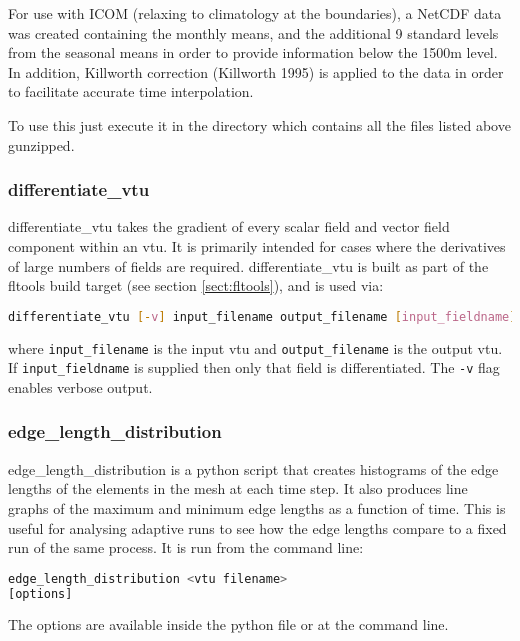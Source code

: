 For use with ICOM (relaxing to climatology at the boundaries), a NetCDF data was created containing the monthly means, and the additional 9 standard levels from the seasonal means in order to provide information below the 1500m level. In addition, Killworth correction (Killworth 1995) is applied to the data in order to facilitate accurate time interpolation.

To use this just execute it in the directory which contains all the files listed above gunzipped.


\subsubsection{differentiate\_vtu}
\label{sect:differentiate_vtu}

differentiate\_vtu takes the gradient of every scalar field and vector field
component within an vtu. It is primarily intended for cases where the derivatives
of large numbers of fields are required. differentiate\_vtu is built as part of the fltools
build target (see section \ref{sect:fltools}), and is used via:

\begin{lstlisting}[language = Bash]
differentiate_vtu [-v] input_filename output_filename [input_fieldname]
\end{lstlisting}

where \lstinline[language = Bash]+input_filename+ is the input vtu and
\lstinline[language = Bash]+output_filename+ is the output vtu. If
\lstinline[language = Bash]+input_fieldname+ is supplied then only that field
is differentiated. The \lstinline[language = Bash]+-v+ flag enables verbose output.


\subsubsection{edge\_length\_distribution}
\label{sect:edgelengthdist}

edge\_length\_distribution is a python script that creates histograms of the edge lengths of the elements in the mesh at each time step. It also produces line graphs of the maximum and minimum edge lengths as a function of time. This is useful for analysing adaptive runs to see how the edge lengths compare to a fixed run of the same process.  It is run from the command line:
\begin{lstlisting}[language = Bash]
edge_length_distribution <vtu filename> 
[options]
\end{lstlisting}
The options are available inside the python file or at the command line.

